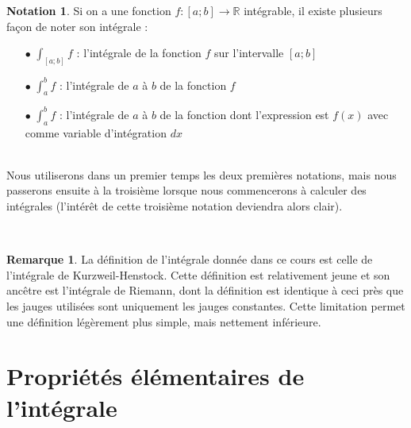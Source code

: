 \documentclass[a4paper,fontsize=13pt]{scrreprt}
\theoremstyle{plain}
\theoremstyle{definition}
\newtheorem{rema}[subsection]{Remarque}
\newtheorem*{nota}{Notation}
\newcommand{\rr}{\mathbb{R}}
\begin{document}
\begin{nota}
Si on a une fonction $f : [a;b] \to \rr$ intégrable, il existe plusieurs façon de noter son intégrale : \\
\begin{itemize}
\item [$\bullet$] $\int_{[a;b]} f$ : \og l'intégrale de la fonction $f$ sur l'intervalle $[a;b]$ \fg{}\\
\item [$\bullet$] $\int_{a}^{b} f$ : \og l'intégrale de $a$ à $b$ de la fonction $f$ \fg{}\\
\item [$\bullet$] $\int_{a}^{b} f$ : \og l'intégrale de $a$ à $b$ de la fonction dont l'expression est $f(x)$ avec comme variable d'intégration $dx$ \fg{}
\end{itemize}~\\
Nous utiliserons dans un premier temps les deux premières notations, mais nous passerons ensuite à la troisième lorsque nous commencerons à calculer des intégrales (l'intérêt de cette troisième notation deviendra alors clair).
\end{nota}
~\\
\begin{rema}
La définition de l'intégrale donnée dans ce cours est celle de l'intégrale de Kurzweil-Henstock. Cette définition est relativement jeune et son ancêtre est l'intégrale de Riemann, dont la définition est identique à ceci près que les jauges utilisées sont uniquement les jauges constantes. Cette limitation permet une définition légèrement plus simple, mais nettement inférieure.
\end{rema}

\chapter{Propriétés élémentaires de l'intégrale}
\end{document}

